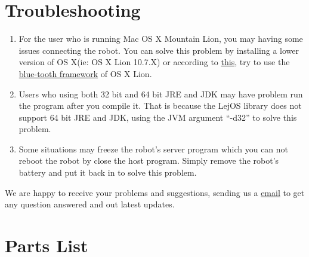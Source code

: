 \documentclass[11pt, a4paper]{report}
\begin{document}
\chapter{Troubleshooting} %
\label{cha:troubleshooting}
\begin{enumerate}
	\item  For the user who is running Mac OS X Mountain Lion, you may having some issues connecting the robot. You can solve this problem by installing a lower version of OS X(ie: OS X Lion 10.7.X) or according to \href{https://groups.google.com/forum/?fromgroups=#!topic/bluecove-users/7jWv1V1GC-4}{this}, try to use the \href{https://bluecove-users.googlegroups.com/attach/8c4cbcadb7aa9e5/IOBluetooth-Lion.tgz?pli=1&view=1&part=4}{blue-tooth framework} of OS X Lion. 

	\item Users who using both 32 bit and 64 bit JRE and JDK may have problem run the program after you compile it. That is because the LejOS library does not support 64 bit JRE and JDK, using the JVM argument ``-d32'' to solve this problem.

	\item Some situations may freeze the robot's server program which you can not reboot the robot by close the host program. Simply remove the robot's battery and put it back in to solve this problem.

\end{enumerate}

We are happy to receive your problems and suggestions, sending us a \href{ro13botech@gmail.com}{email} to get any question answered and out latest updates.





\newpage
\appendix

\chapter{Parts List} %
\label{cha:parts_list}
\end{document}
